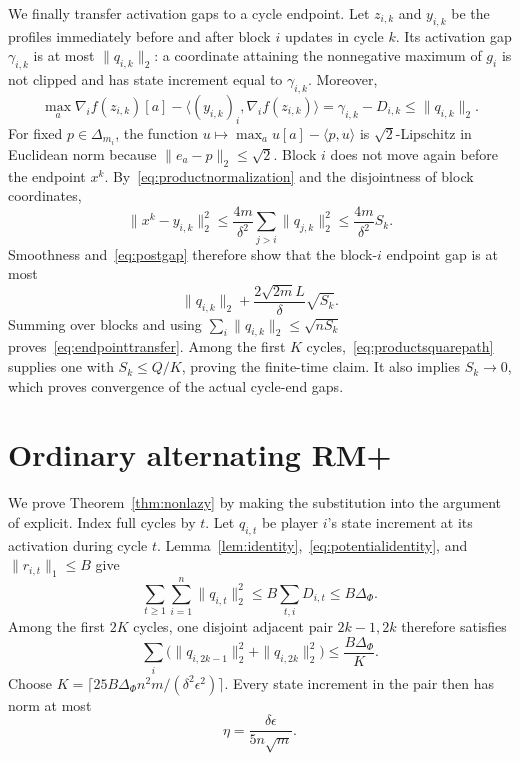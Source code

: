 \documentclass{article}
\begin{document}
We finally transfer activation gaps to a cycle endpoint. Let $z_{i,k}$ and $y_{i,k}$ be the profiles immediately before and after block $i$ updates in cycle $k$. Its activation gap $\gamma_{i,k}$ is at most $\|q_{i,k}\|_2$: a coordinate attaining the nonnegative maximum of $g_i$ is not clipped and has state increment equal to $\gamma_{i,k}$. Moreover,
\begin{equation}
\max_a\nabla_i f(z_{i,k})[a]-\langle (y_{i,k})_i,\nabla_i f(z_{i,k})\rangle
=\gamma_{i,k}-D_{i,k}\le\|q_{i,k}\|_2.
\label{eq:postgap}
\end{equation}
For fixed $p\in\Delta_{m_i}$, the function $u\mapsto\max_a u[a]-\langle p,u\rangle$ is $\sqrt2$-Lipschitz in Euclidean norm because $\|e_a-p\|_2\le\sqrt2$. Block $i$ does not move again before the endpoint $x^k$. By~\eqref{eq:productnormalization} and the disjointness of block coordinates,
\begin{equation}
\|x^k-y_{i,k}\|_2^2
\le\frac{4m}{\delta^2}\sum_{j>i}\|q_{j,k}\|_2^2
\le\frac{4m}{\delta^2}S_k.
\end{equation}
Smoothness and~\eqref{eq:postgap} therefore show that the block-$i$ endpoint gap is at most
\begin{equation}
\|q_{i,k}\|_2+\frac{2\sqrt{2m}L}{\delta}\sqrt{S_k}.
\end{equation}
Summing over blocks and using $\sum_i\|q_{i,k}\|_2\le\sqrt{nS_k}$ proves~\eqref{eq:endpointtransfer}. Among the first $K$ cycles,~\eqref{eq:productsquarepath} supplies one with $S_k\le Q/K$, proving the finite-time claim. It also implies $S_k\to0$, which proves convergence of the actual cycle-end gaps.

\section{Ordinary alternating RM+}
\label{app:nonlazy}

We prove Theorem~\ref{thm:nonlazy} by making the substitution into the argument of \citet{Anagnostides26:Convergence} explicit. Index full cycles by $t$. Let $q_{i,t}$ be player $i$'s state increment at its activation during cycle $t$. Lemma~\ref{lem:identity},~\eqref{eq:potentialidentity}, and $\|r_{i,t}\|_1\le B$ give
\begin{equation}
\sum_{t\ge1}\sum_{i=1}^n\|q_{i,t}\|_2^2
\le B\sum_{t,i}D_{i,t}
\le B\Delta_\Phi.
\label{eq:squarepath}
\end{equation}
Among the first $2K$ cycles, one disjoint adjacent pair $2k-1,2k$ therefore satisfies
\begin{equation}
\sum_i\bigl(\|q_{i,2k-1}\|_2^2+\|q_{i,2k}\|_2^2\bigr)
\le\frac{B\Delta_\Phi}{K}.
\label{eq:smallpair}
\end{equation}
Choose $K=\lceil25B\Delta_\Phi n^2m/(\delta^2\epsilon^2)\rceil$. Every state increment in the pair then has norm at most
\begin{equation}
\eta=\frac{\delta\epsilon}{5n\sqrt m}.
\end{equation}
\end{document}
